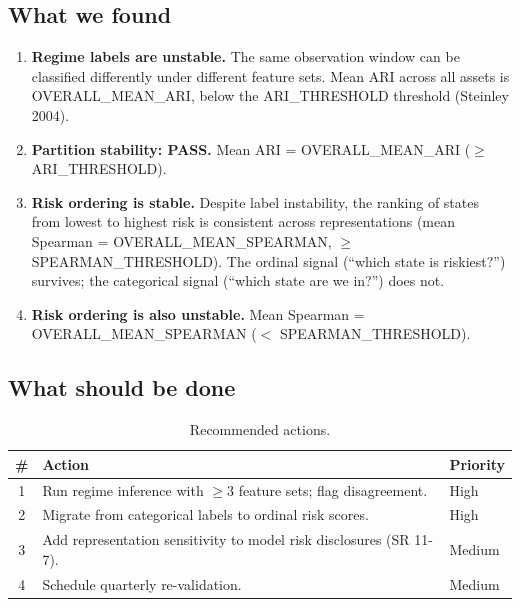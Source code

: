 \documentclass[11pt,a4paper]{article}
\begin{document}
\subsection{What we found}
\begin{enumerate}[leftmargin=2em]
\item \textbf{Regime labels are unstable.} The same observation window can be
      classified differently under different feature sets. Mean ARI across
      all assets is {{OVERALL_MEAN_ARI}}, below the {{ARI_THRESHOLD}} threshold
      (Steinley 2004).
\item \textbf{Partition stability: PASS.} Mean ARI = {{OVERALL_MEAN_ARI}}
      ($\geq$ {{ARI_THRESHOLD}}).
\item \textbf{Risk ordering is stable.} Despite label instability, the
      ranking of states from lowest to highest risk is consistent across
      representations (mean Spearman = {{OVERALL_MEAN_SPEARMAN}},
      $\geq$ {{SPEARMAN_THRESHOLD}}).
      The ordinal signal (``which state is riskiest?'') survives; the
      categorical signal (``which state are we in?'') does not.
\item \textbf{Risk ordering is also unstable.} Mean Spearman =
      {{OVERALL_MEAN_SPEARMAN}} ($<$ {{SPEARMAN_THRESHOLD}}).
\end{enumerate}

\subsection{What should be done}
\begin{table}[H]
\centering
\renewcommand{\arraystretch}{1.3}
\begin{tabularx}{\textwidth}{c X l}
\toprule
\textbf{\#} & \textbf{Action} & \textbf{Priority} \\
\midrule
1 & Run regime inference with $\geq$3 feature sets; flag disagreement. & High \\
2 & Migrate from categorical labels to ordinal risk scores. & High \\
3 & Add representation sensitivity to model risk disclosures (SR 11-7). & Medium \\
4 & Schedule quarterly re-validation. & Medium \\
\bottomrule
\end{tabularx}
\caption{Recommended actions.}
\end{table}


\end{document}
